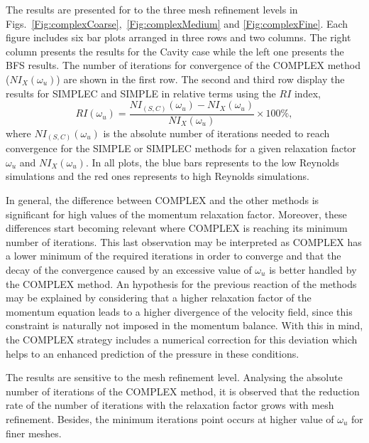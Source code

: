 \documentclass[final,3p,times,11pt,onecolumn]{myElsarticle}
\numberwithin{equation}{section}
\begin{document}
The results are presented for to the three mesh refinement levels in Figs.~\ref{Fig:complexCoarse},~\ref{Fig:complexMedium} and \ref{Fig:complexFine}. Each figure includes six bar plots arranged in three rows and two columns. The right column presents the results for the Cavity case while the left one presents the BFS results. The number of iterations for convergence of the COMPLEX method ($NI_X(\omega_u)$) are shown in the first row. The second and third row display the results for SIMPLEC and SIMPLE in relative terms using the $RI$ index,
\begin{equation}
RI(\omega_u)
=
\dfrac
{NI_{(S,C)}(\omega_u) - NI_X(\omega_u)}
{NI_X(\omega_u)}
\times
100\%,
\end{equation}
where $NI_{(S,C)}(\omega_u)$ is the absolute number of iterations needed to reach convergence for the SIMPLE or SIMPLEC methods for a given relaxation factor $\omega_u$ and $NI_X(\omega_u)$. 
In all plots, the blue bars represents to the low Reynolds simulations and the red ones represents to high Reynolds simulations.

In general, the difference between COMPLEX and the other methods is significant for high values of the momentum relaxation factor. Moreover, these differences start becoming relevant where COMPLEX is reaching its minimum number of iterations. This last observation may be interpreted as COMPLEX has a lower minimum of the required iterations in order to converge and that the decay of the convergence caused by an excessive value of $\omega_u$ is better handled by the COMPLEX method. An hypothesis for the previous reaction of the methods may be explained by considering that a higher relaxation factor of the momentum equation leads to a higher divergence of the velocity field, since this constraint is naturally not imposed in the momentum balance. With this in mind, the COMPLEX strategy includes a numerical correction for this deviation which helps to an enhanced prediction of the pressure in these conditions.


The results are sensitive to the mesh refinement level. Analysing the absolute number of iterations of the COMPLEX method, it is observed that the reduction rate of the number of iterations with the relaxation factor grows with mesh refinement. Besides, the minimum iterations point occurs at higher value of $\omega_u$ for finer meshes.
\end{document}
